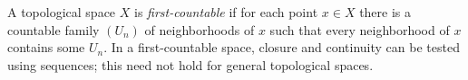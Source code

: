 
A topological space $X$ is \emph{first-countable} if for each point $x\in X$ there is a countable family $(U_n)$ of neighborhoods of $x$ such that every neighborhood of $x$ contains some $U_n$. In a first-countable space, closure and continuity can be tested using sequences; this need not hold for general topological spaces.
